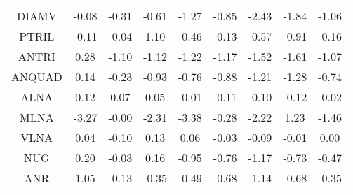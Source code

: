 \documentclass[11pt,a4paper]{report}
\begin{document}
\begin{longtable}{ | c || c | c | c | c | c | c | c || c |}
DIAMV &  \cellcolor[HTML]{FFFFFF} -0.08 &  \cellcolor[HTML]{FFF7F7} -0.31 &  \cellcolor[HTML]{FFEFEF} -0.61 &  \cellcolor[HTML]{FFDFDF} -1.27 &  \cellcolor[HTML]{FFE7E7} -0.85 &  \cellcolor[HTML]{FFBFBF} -2.43 &  \cellcolor[HTML]{FFCFCF} -1.84 &  \cellcolor[HTML]{FFE7E7} -1.06 \\
PTRIL &  \cellcolor[HTML]{FFFFFF} -0.11 &  \cellcolor[HTML]{FFFFFF} -0.04 &  \cellcolor[HTML]{E7E7FF} 1.10 &  \cellcolor[HTML]{FFF7F7} -0.46 &  \cellcolor[HTML]{FFFFFF} -0.13 &  \cellcolor[HTML]{FFEFEF} -0.57 &  \cellcolor[HTML]{FFE7E7} -0.91 &  \cellcolor[HTML]{FFF7F7} -0.16 \\
ANTRI &  \cellcolor[HTML]{F7F7FF} 0.28 &  \cellcolor[HTML]{FFE7E7} -1.10 &  \cellcolor[HTML]{FFDFDF} -1.12 &  \cellcolor[HTML]{FFDFDF} -1.22 &  \cellcolor[HTML]{FFDFDF} -1.17 &  \cellcolor[HTML]{FFD7D7} -1.52 &  \cellcolor[HTML]{FFD7D7} -1.61 &  \cellcolor[HTML]{FFE7E7} -1.07 \\
ANQUAD &  \cellcolor[HTML]{FFFFFF} 0.14 &  \cellcolor[HTML]{FFF7F7} -0.23 &  \cellcolor[HTML]{FFE7E7} -0.93 &  \cellcolor[HTML]{FFEFEF} -0.76 &  \cellcolor[HTML]{FFE7E7} -0.88 &  \cellcolor[HTML]{FFDFDF} -1.21 &  \cellcolor[HTML]{FFDFDF} -1.28 &  \cellcolor[HTML]{FFEFEF} -0.74 \\
ALNA &  \cellcolor[HTML]{FFFFFF} 0.12 &  \cellcolor[HTML]{FFFFFF} 0.07 &  \cellcolor[HTML]{FFFFFF} 0.05 &  \cellcolor[HTML]{FFFFFF} -0.01 &  \cellcolor[HTML]{FFFFFF} -0.11 &  \cellcolor[HTML]{FFFFFF} -0.10 &  \cellcolor[HTML]{FFFFFF} -0.12 &  \cellcolor[HTML]{FFFFFF} -0.02 \\
MLNA &  \cellcolor[HTML]{FFAFAF} -3.27 &  \cellcolor[HTML]{FFFFFF} -0.00 &  \cellcolor[HTML]{FFC7C7} -2.31 &  \cellcolor[HTML]{FFA7A7} -3.38 &  \cellcolor[HTML]{FFF7F7} -0.28 &  \cellcolor[HTML]{FFC7C7} -2.22 &  \cellcolor[HTML]{DFDFFF} 1.23 &  \cellcolor[HTML]{FFD7D7} -1.46 \\
VLNA &  \cellcolor[HTML]{FFFFFF} 0.04 &  \cellcolor[HTML]{FFFFFF} -0.10 &  \cellcolor[HTML]{FFFFFF} 0.13 &  \cellcolor[HTML]{FFFFFF} 0.06 &  \cellcolor[HTML]{FFFFFF} -0.03 &  \cellcolor[HTML]{FFFFFF} -0.09 &  \cellcolor[HTML]{FFFFFF} -0.01 &  \cellcolor[HTML]{FFFFFF} 0.00 \\
NUG &  \cellcolor[HTML]{F7F7FF} 0.20 &  \cellcolor[HTML]{FFFFFF} -0.03 &  \cellcolor[HTML]{F7F7FF} 0.16 &  \cellcolor[HTML]{FFE7E7} -0.95 &  \cellcolor[HTML]{FFEFEF} -0.76 &  \cellcolor[HTML]{FFDFDF} -1.17 &  \cellcolor[HTML]{FFEFEF} -0.73 &  \cellcolor[HTML]{FFF7F7} -0.47 \\
ANR &  \cellcolor[HTML]{E7E7FF} 1.05 &  \cellcolor[HTML]{FFFFFF} -0.13 &  \cellcolor[HTML]{FFF7F7} -0.35 &  \cellcolor[HTML]{FFEFEF} -0.49 &  \cellcolor[HTML]{FFEFEF} -0.68 &  \cellcolor[HTML]{FFDFDF} -1.14 &  \cellcolor[HTML]{FFEFEF} -0.68 &  \cellcolor[HTML]{FFF7F7} -0.35 \\

\end{longtable}
\end{document}
